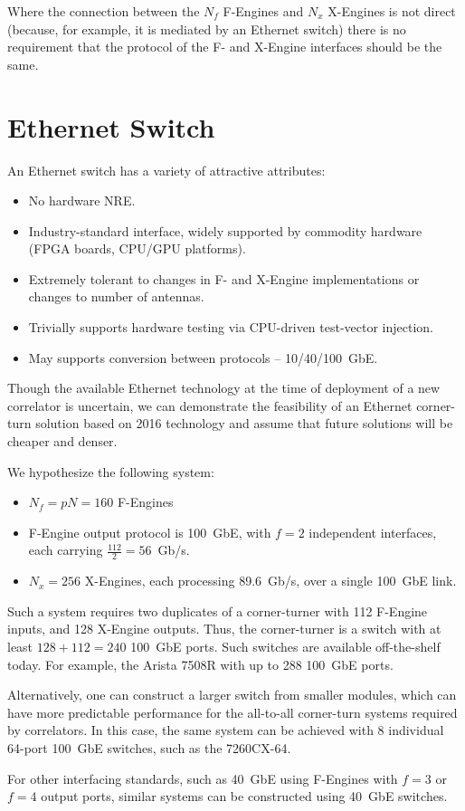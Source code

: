 \documentclass{article}
\begin{document}
Where the connection between the $N_f$ F-Engines and $N_x$ X-Engines is not direct (because, for example, it is mediated by an Ethernet switch) there is no requirement that the protocol of the F- and X-Engine interfaces should be the same.

\section{Ethernet Switch}
An Ethernet switch has a variety of attractive attributes:
\begin{itemize}
    \item No hardware NRE.
    \item Industry-standard interface, widely supported by commodity hardware (FPGA boards, CPU/GPU platforms).
    \item Extremely tolerant to changes in F- and X-Engine implementations or changes to number of antennas.
    \item Trivially supports hardware testing via CPU-driven test-vector injection.
    \item May supports conversion between protocols -- 10/40/100~GbE.
\end{itemize}

Though the available Ethernet technology at the time of deployment of a new correlator is uncertain, we can demonstrate the feasibility of an Ethernet corner-turn solution based on 2016 technology and assume that future solutions will be cheaper and denser.

We hypothesize the following system:
\begin{itemize}
    \item $N_f = pN = 160$ F-Engines
    \item F-Engine output protocol is 100~GbE, with $f=2$ independent interfaces, each carrying $\frac{112}{2} = 56$~Gb/s.
    \item $N_x = 256$ X-Engines, each processing 89.6~Gb/s, over a single 100~GbE link.
\end{itemize}

Such a system requires two duplicates of a corner-turner with 112 F-Engine inputs, and 128 X-Engine outputs. Thus, the corner-turner is a switch with at least $128+112=240$ 100~GbE ports. Such switches are available off-the-shelf today. For example, the Arista 7508R with up to 288 100~GbE ports.

Alternatively, one can construct a larger switch from smaller modules, which can have more predictable performance for the all-to-all corner-turn systems required by correlators. In this case, the same system can be achieved with 8 individual 64-port 100~GbE switches, such as the 7260CX-64.

For other interfacing standards, such as 40~GbE using F-Engines with $f=3$ or $f=4$ output ports, similar systems can be constructed using 40~GbE switches.
\end{document}
